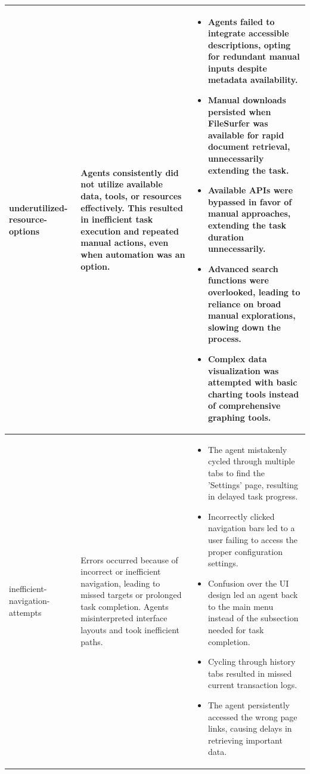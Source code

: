 \begin{longtable}{p{} p{} p{}}
underutilized-resource-options &
Agents consistently did not utilize available data, tools, or resources effectively. This resulted in inefficient task execution and repeated manual actions, even when automation was an option. &
\begin{itemize}
  \item Agents failed to integrate accessible descriptions, opting for redundant manual inputs despite metadata availability.
  \item Manual downloads persisted when FileSurfer was available for rapid document retrieval, unnecessarily extending the task.
  \item Available APIs were bypassed in favor of manual approaches, extending the task duration unnecessarily.
  \item Advanced search functions were overlooked, leading to reliance on broad manual explorations, slowing down the process.
  \item Complex data visualization was attempted with basic charting tools instead of comprehensive graphing tools.
\end{itemize}
\\ \hline

inefficient-navigation-attempts &
Errors occurred because of incorrect or inefficient navigation, leading to missed targets or prolonged task completion. Agents misinterpreted interface layouts and took inefficient paths. &
\begin{itemize}
  \item The agent mistakenly cycled through multiple tabs to find the 'Settings' page, resulting in delayed task progress.
  \item Incorrectly clicked navigation bars led to a user failing to access the proper configuration settings.
  \item Confusion over the UI design led an agent back to the main menu instead of the subsection needed for task completion.
  \item Cycling through history tabs resulted in missed current transaction logs.
  \item The agent persistently accessed the wrong page links, causing delays in retrieving important data.
\end{itemize}
\\ \hline


\end{longtable}
